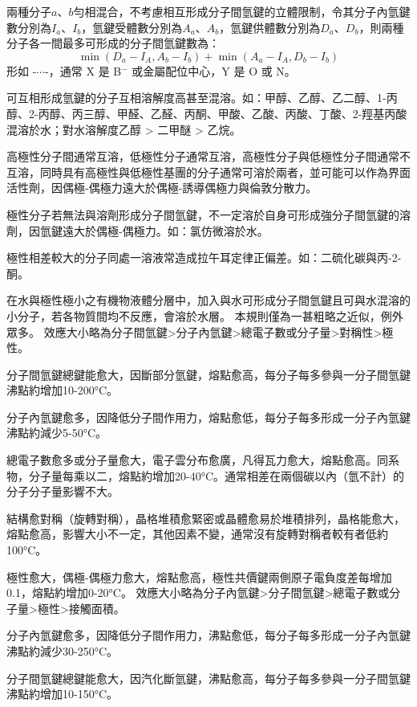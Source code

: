 \documentclass[a4paper,12pt]{report}
\begin{document}
兩種分子$a$、$b$勻相混合，不考慮相互形成分子間氫鍵的立體限制，令其分子內氫鍵數分別為$I_a$、$I_b$，氫鍵受體數分別為$A_a$、$A_b$，氫鍵供體數分別為$D_a$、$D_b$，則兩種分子各一間最多可形成的分子間氫鍵數為：
\[\min(D_a-I_A,A_b-I_b)+\min(A_a-I_A,D_b-I_b)\]
形如 -$\cdots$-，通常 X 是 B$^-$ 或金屬配位中心，Y 是 O 或 N。
\bit
\item 可互相形成氫鍵的分子互相溶解度高甚至混溶。如：甲醇、乙醇、乙二醇、1-丙醇、2-丙醇、丙三醇、甲醛、乙醛、丙酮、甲酸、乙酸、丙酸、丁酸、2-羥基丙酸混溶於水；對水溶解度乙醇 > 二甲醚 > 乙烷。
\item 高極性分子間通常互溶，低極性分子通常互溶，高極性分子與低極性分子間通常不互溶，同時具有高極性與低極性基團的分子通常可溶於兩者，並可能可以作為界面活性劑，因偶極-偶極力遠大於偶極-誘導偶極力與倫敦分散力。
\item 極性分子若無法與溶劑形成分子間氫鍵，不一定溶於自身可形成強分子間氫鍵的溶劑，因氫鍵遠大於偶極-偶極力。如：氯仿微溶於水。
\item 極性相差較大的分子同處一溶液常造成拉午耳定律正偏差。如：二硫化碳與丙-2-酮。
\item 在水與極性極小之有機物液體分層中，加入與水可形成分子間氫鍵且可與水混溶的小分子，若各物質間均不反應，會溶於水層。
\eit
{}
本規則僅為一甚粗略之近似，例外眾多。
效應大小略為分子間氫鍵>分子內氫鍵>總電子數或分子量>對稱性>極性。
\bit
\item 分子間氫鍵總鍵能愈大，因斷部分氫鍵，熔點愈高，每分子每多參與一分子間氫鍵沸點約增加10-200°C。
\item 分子內氫鍵愈多，因降低分子間作用力，熔點愈低，每分子每多形成一分子內氫鍵沸點約減少5-50°C。
\item 總電子數愈多或分子量愈大，電子雲分布愈廣，凡得瓦力愈大，熔點愈高。同系物，分子量每乘以二，熔點約增加20-40°C。通常相差在兩個碳以內（氫不計）的分子分子量影響不大。
\item 結構愈對稱（旋轉對稱），晶格堆積愈緊密或晶體愈易於堆積排列，晶格能愈大，熔點愈高，影響大小不一定，其他因素不變，通常沒有旋轉對稱者較有者低約 100°C。
\item 極性愈大，偶極-偶極力愈大，熔點愈高，極性共價鍵兩側原子電負度差每增加0.1，熔點約增加0-20°C。
\eit
{}
效應大小略為分子內氫鍵>分子間氫鍵>總電子數或分子量>極性>接觸面積。
\bit
\item 分子內氫鍵愈多，因降低分子間作用力，沸點愈低，每分子每多形成一分子內氫鍵沸點約減少30-250°C。
\item 分子間氫鍵總鍵能愈大，因汽化斷氫鍵，沸點愈高，每分子每多參與一分子間氫鍵沸點約增加10-150°C。
\end{document}
